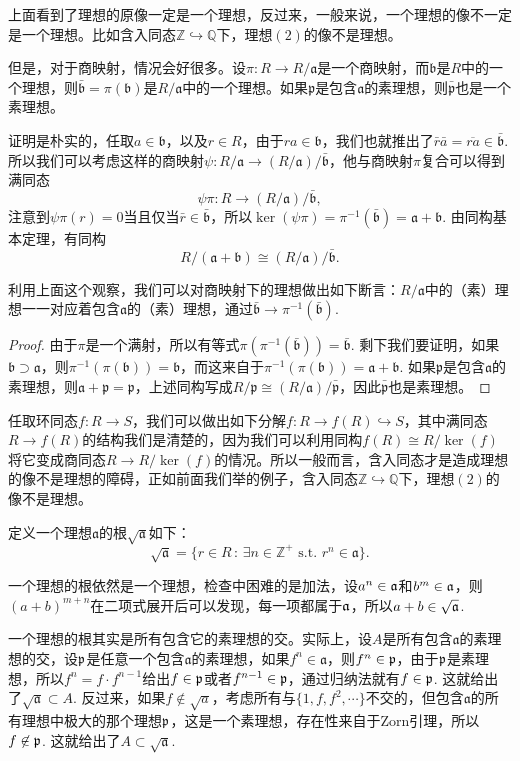 \para 上面看到了理想的原像一定是一个理想，反过来，一般来说，一个理想的像不一定是一个理想。比如含入同态$\mathbb{Z}\hookrightarrow \mathbb{Q}$下，理想$(2)$的像不是理想。

但是，对于商映射，情况会好很多。设$\pi:R\to R/\mathfrak{a}$是一个商映射，而$\mathfrak{b}$是$R$中的一个理想，则$\bar{\mathfrak{b}}=\pi(\mathfrak{b})$是$R/\mathfrak{a}$中的一个理想。如果$\mathfrak{p}$是包含$\mathfrak{a}$的素理想，则$\bar{\mathfrak{p}}$也是一个素理想。

证明是朴实的，任取$a\in \mathfrak{b}$，以及$r \in R$，由于$ra\in \mathfrak{b}$，我们也就推出了$\bar{r}\bar{a}=\overline{ra}\in \bar{\mathfrak{b}}$. 所以我们可以考虑这样的商映射$\psi: R/\mathfrak{a}\to (R/\mathfrak{a})/\bar{\mathfrak{b}}$，他与商映射$\pi$复合可以得到满同态
\[
	\psi\pi:R\to (R/\mathfrak{a})/\bar{\mathfrak{b}},
\]
注意到$\psi\pi(r)=0$当且仅当$\bar{r}\in \bar{\mathfrak{b}}$，所以$\ker(\psi\pi)=\pi^{-1}(\bar{\mathfrak{b}})=\mathfrak{a}+\mathfrak{b}$. 由同构基本定理，有同构
\[
	R/(\mathfrak{a}+\mathfrak{b})\cong (R/\mathfrak{a})/\bar{\mathfrak{b}}.
\]

\para 利用上面这个观察，我们可以对商映射下的理想做出如下断言：$R/\mathfrak{a}$中的（素）理想一一对应着包含$\mathfrak{a}$的（素）理想，通过$\bar{\mathfrak{b}}\to \pi^{-1}(\bar{\mathfrak{b}})$.

\begin{proof} 
	由于$\pi$是一个满射，所以有等式$\pi(\pi^{-1}(\bar{\mathfrak{b}}))=\bar{\mathfrak{b}}$. 剩下我们要证明，如果$\mathfrak{b}\supset \mathfrak{a}$，则$\pi^{-1}(\pi(\mathfrak{b}))=\mathfrak{b}$，而这来自于$\pi^{-1}(\pi(\mathfrak{b}))=\mathfrak{a}+\mathfrak{b}$. 如果$\mathfrak{p}$是包含$\mathfrak{a}$的素理想，则$\mathfrak{a}+\mathfrak{p}=\mathfrak{p}$，上述同构写成$R/\mathfrak{p}\cong (R/\mathfrak{a})/\bar{\mathfrak{p}}$，因此$\bar{\mathfrak{p}}$也是素理想。
\end{proof}

\para 任取环同态$f:R\to S$，我们可以做出如下分解$f:R\to f(R)\hookrightarrow S$，其中满同态$R\to f(R)$的结构我们是清楚的，因为我们可以利用同构$f(R)\cong R/\ker(f)$将它变成商同态$R\to R/\ker(f)$的情况。所以一般而言，含入同态才是造成理想的像不是理想的障碍，正如前面我们举的例子，含入同态$\mathbb{Z}\hookrightarrow \mathbb{Q}$下，理想$(2)$的像不是理想。

\para 定义一个理想$\mathfrak{a}$的根$\sqrt{\mathfrak{a}}$如下：
\[
	\sqrt{\mathfrak{a}}=\{r\in R\,:\,\exists n\in \mathbb{Z}^+\text{ s.t. }r^n\in \mathfrak{a}\}.
\]

一个理想的根依然是一个理想，检查中困难的是加法，设$a^n\in \mathfrak{a}$和$b^m\in \mathfrak{a}$，则$(a+b)^{m+n}$在二项式展开后可以发现，每一项都属于$\mathfrak{a}$，所以$a+b\in \sqrt{\mathfrak{a}}$.

一个理想的根其实是所有包含它的素理想的交。实际上，设$A$是所有包含$\mathfrak{a}$的素理想的交，设$\mathfrak{p}$是任意一个包含$\mathfrak{a}$的素理想，如果$f^n\in \mathfrak{a}$，则$f^n\in \mathfrak{p}$，由于$\mathfrak{p}$是素理想，所以$f^n=f\cdot f^{n-1}$给出$f\in\mathfrak{p}$或者$f^{n-1}\in\mathfrak{p}$，通过归纳法就有$f\in \mathfrak{p}$. 这就给出了$\sqrt{\mathfrak{a}}\subset A$. 反过来，如果$f\not\in \sqrt{a}$，考虑所有与$\{1,f,f^2,\cdots\}$不交的，但包含$\mathfrak{a}$的所有理想中极大的那个理想$\mathfrak{p}$，这是一个素理想，存在性来自于Zorn引理，所以$f\not\in \mathfrak{p}$. 这就给出了$A\subset \sqrt{\mathfrak{a}}$.